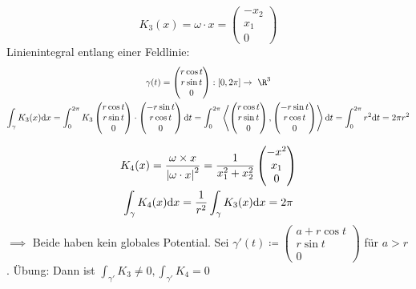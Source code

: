\begin{bsp*}[note = 3]
	\[ K_3(x) = \omega \cdot x = \begin{pmatrix} -x_2 \\ x_1 \\ 0 \end{pmatrix} \]
	Linienintegral entlang einer Feldlinie:
	\begin{gather*}
		\gamma(t) = \begin{pmatrix} r \cos t \\ r \sin t \\ 0 \end{pmatrix} : [0 , 2\pi] \rightarrow \R^3 \\
		\int_{\gamma} K_3(x) \dd x = \int_0^{2\pi} K_3\begin{pmatrix} r \cos t \\ r \sin t \\ 0 \end{pmatrix} \cdot \begin{pmatrix} -r \sin t \\ r \cos t \\ 0 \end{pmatrix} \dd t = \int_0^{2\pi} \left\langle \begin{pmatrix} r \cos t \\ r \sin t \\ 0 \end{pmatrix} , \begin{pmatrix} -r \sin t \\ r \cos t \\ 0 \end{pmatrix} \right\rangle \dd t = \int_0^{2\pi} r^2 \dd t = 2\pi r^2 
	\end{gather*}
\end{bsp*}
\begin{bsp*}[note = 4]
	\begin{gather*}
		K_4(x) = \frac{\omega \times x}{\abs{\omega \cdot x}^2} = \frac{1}{x_1^2 + x_2^2} \begin{pmatrix} -x^2 \\ x_1 \\ 0 \end{pmatrix} \\
		\int_{\gamma} K_4(x) \dd x = \frac{1}{r^2} \int_{\gamma} K_3(x) \dd x = 2\pi
	\end{gather*}
	$\implies$ Beide haben kein globales Potential.
	Sei $\gamma'(t) \coloneqq \begin{pmatrix} a + r \cos t \\ r \sin t \\ 0 \end{pmatrix}$ für $a > r$. Übung: Dann ist $\int_{\gamma'} K_3 \neq 0 , \int_{\gamma'} K_4 = 0$
\end{bsp*}

